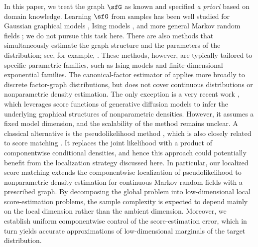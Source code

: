 \documentclass[11pt]{article}
\begin{document}
In this paper, we treat the graph $\sfG$ as known and specified \emph{a priori} based on domain knowledge.
Learning $\sfG$ from samples has been well studied for Gaussian graphical models \cite{MR2278363}, Ising models \cite{MR2662343}, and more general Markov random fields \cite{MR3037003,MR3734242,NIPS2017_ea8fcd92,kwon2026nonparametric}; we do not pursue this task here.
%
There are also methods that simultaneously estimate the graph structure and the parameters of the distribution; see, for example, \cite{MR3388257,MR3486418,MR3734242}.
These methods, however, are typically tailored to specific parametric families, such as Ising models and finite-dimensional exponential families.
The canonical-factor estimator of \cite{MR2274423} applies more broadly to discrete factor-graph distributions, but does not cover continuous distributions or nonparametric density estimation.
The only exception is a very recent work \cite{kwon2026nonparametric}, which leverages score functions of generative diffusion models to infer the underlying graphical structures of nonparametric densities. However, it assumes a fixed model dimension, and the scalability of the method remains unclear.
%
A classical alternative is the pseudolikelihood method \cite{Besag1975Pseudo}, which is also closely related to score matching \cite{JMLR:v6:hyvarinen05a,DBLP:conf/iclr/KoehlerHR23}. It replaces the joint likelihood with a product of componentwise conditional densities, and hence this approach could potentially benefit from the localization strategy discussed here. 
%
In particular, our localized score matching extends the componentwise localization of pseudolikelihood to nonparametric density estimation for continuous Markov random fields with a prescribed graph. 
%
By decomposing the global problem into low-dimensional local score-estimation problems, the sample complexity is expected to depend mainly on the local dimension rather than the ambient dimension. Moreover, we establish uniform componentwise control of the score-estimation error, which in turn yields accurate approximations of low-dimensional marginals of the target distribution.
\end{document}
